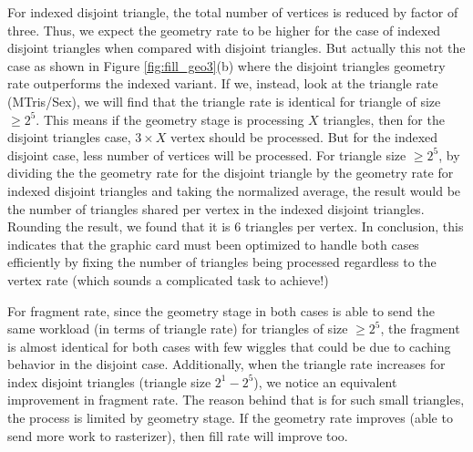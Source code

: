 For indexed disjoint triangle, the total number of vertices is reduced by factor of three. Thus, we expect the geometry rate to be higher for the case of indexed disjoint triangles when compared with disjoint triangles. But actually this not the case as shown in Figure \ref{fig:fill_geo3}(b) where the disjoint triangles geometry rate outperforms the indexed variant. If we, instead, look at the triangle rate (MTris/Sex), we will find that the triangle rate is identical for triangle of size $\geq2^{5}$. This means if the geometry stage is processing $X$ triangles, then for the disjoint triangles case, $3\times X$ vertex should be processed. But for the indexed disjoint case, less number of vertices will be processed. For triangle size $\geq2^{5}$, by dividing the the geometry rate for the disjoint triangle by the geometry rate for indexed disjoint triangles and taking the normalized average, the result would be the number of triangles shared per vertex in the indexed disjoint triangles. Rounding the result, we found that it is 6 triangles per vertex. In conclusion, this indicates that the graphic card must been optimized to handle both cases efficiently by fixing the number of triangles being processed regardless to the vertex rate (which sounds a complicated task to achieve!)

For fragment rate, since the geometry stage in both cases is able to send the same workload (in terms of triangle rate) for triangles of size $\geq 2^{5}$, the fragment is almost identical for both cases with few wiggles that could be due to caching behavior in the disjoint case. Additionally, when the triangle rate increases for index disjoint triangles (triangle size $2^{1}-2^{5}$), we notice an equivalent improvement in fragment rate. The reason behind that is for such small triangles, the process is limited by geometry stage. If the geometry rate improves (able to send more work to rasterizer), then fill rate will improve too. 

